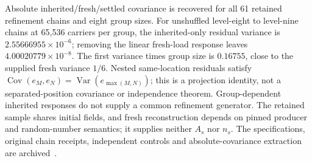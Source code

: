 Absolute inherited/fresh/settled covariance is recovered for all 61
retained refinement chains and eight group sizes. For unshuffled
level-eight to level-nine chains at 65,536 carriers per group, the
inherited-only residual variance is \(2.55666955\times10^{-6}\);
removing the linear fresh-load response leaves
\(4.00020779\times10^{-8}\). The first variance times group size is
\(0.16755\), close to the supplied fresh variance \(1/6\).
Nested same-location residuals satisfy
\(\operatorname{Cov}(e_M,e_N)=\operatorname{Var}(e_{\max(M,N)})\);
this is a projection identity, not a separated-position covariance or
independence theorem. Group-dependent inherited responses do not supply
a common refinement generator. The retained sample shares initial fields,
and fresh reconstruction depends on pinned producer and random-number
semantics; it supplies neither \(A_s\) nor \(n_s\).
The specifications, original chain receipts, independent controls and
absolute-covariance extraction are archived~\cite{ophobsdyn}.
